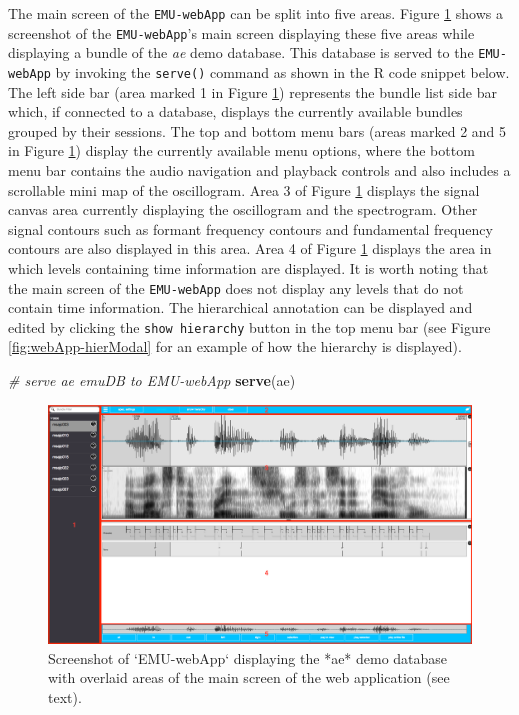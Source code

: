 \documentclass[]{book}
\newenvironment{Shaded}{\begin{snugshade}}{\end{snugshade}}
\newcommand{\CommentTok}[1]{\textcolor[rgb]{0.56,0.35,0.01}{\textit{#1}}}
\newcommand{\KeywordTok}[1]{\textcolor[rgb]{0.13,0.29,0.53}{\textbf{#1}}}
\newcommand{\NormalTok}[1]{#1}
\begin{document}
The main screen of the \texttt{EMU-webApp} can be split into five areas. Figure \ref{fig:emu-web-emuWebAppLayout} shows a screenshot of the \texttt{EMU-webApp}'s main screen displaying these five areas while displaying a bundle of the \emph{ae} demo database. This database is served to the \texttt{EMU-webApp} by invoking the \texttt{serve()} command as shown in the R code snippet below. The left side bar (area marked 1 in Figure \ref{fig:emu-web-emuWebAppLayout}) represents the bundle list side bar which, if connected to a database, displays the currently available bundles grouped by their sessions. The top and bottom menu bars (areas marked 2 and 5 in Figure \ref{fig:emu-web-emuWebAppLayout}) display the currently available menu options, where the bottom menu bar contains the audio navigation and playback controls and also includes a scrollable mini map of the oscillogram. Area 3 of Figure \ref{fig:emu-web-emuWebAppLayout} displays the signal canvas area currently displaying the oscillogram and the spectrogram. Other signal contours such as formant frequency contours and fundamental frequency contours are also displayed in this area. Area 4 of Figure \ref{fig:emu-web-emuWebAppLayout} displays the area in which levels containing time information are displayed. It is worth noting that the main screen of the \texttt{EMU-webApp} does not display any levels that do not contain time information. The hierarchical annotation can be displayed and edited by clicking the \texttt{show\ hierarchy} button in the top menu bar (see Figure \ref{fig:webApp-hierModal} for an example of how the hierarchy is displayed).

\begin{Shaded}
\begin{Highlighting}[]
\CommentTok{# serve ae emuDB to EMU-webApp}
\KeywordTok{serve}\NormalTok{(ae)}
\end{Highlighting}
\end{Shaded}

\begin{figure}

{\centering \includegraphics[width=1\linewidth]{pics/emu-webAppLayout} 

}

\caption{Screenshot of `EMU-webApp` displaying the *ae* demo database with overlaid areas of the main screen of the web application (see text).}\label{fig:emu-web-emuWebAppLayout}
\end{figure}
\end{document}
